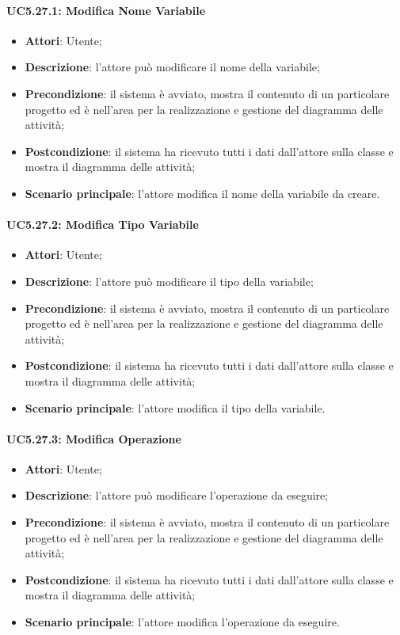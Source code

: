 \paragraph{UC5.27.1: Modifica Nome Variabile}
\label{UC5.27.1}
\begin{itemize}
	\item \textbf{Attori}: Utente;
	\item \textbf{Descrizione}: l'attore può modificare il nome della variabile;
	\item \textbf{Precondizione}: il sistema è avviato, mostra il contenuto di un particolare progetto ed è nell'area per la realizzazione e gestione del diagramma delle attività;
	\item \textbf{Postcondizione}: il sistema ha ricevuto tutti i dati dall'attore sulla classe e mostra il diagramma delle attività;
	\item \textbf{Scenario principale}: l'attore modifica il nome della variabile da creare.
\end{itemize}

\paragraph{UC5.27.2: Modifica Tipo Variabile}
\label{UC5.27.2}
\begin{itemize}
	\item \textbf{Attori}: Utente;
	\item \textbf{Descrizione}: l'attore può modificare il tipo della variabile;
	\item \textbf{Precondizione}: il sistema è avviato, mostra il contenuto di un particolare progetto ed è nell'area per la realizzazione e gestione del diagramma delle attività;
	\item \textbf{Postcondizione}: il sistema ha ricevuto tutti i dati dall'attore sulla classe e mostra il diagramma delle attività;
	\item \textbf{Scenario principale}: l'attore modifica il tipo della variabile.
\end{itemize}

\paragraph{UC5.27.3: Modifica Operazione}
\label{UC5.27.3}
\begin{itemize}
	\item \textbf{Attori}: Utente;
	\item \textbf{Descrizione}: l'attore può modificare l'operazione da eseguire;
	\item \textbf{Precondizione}: il sistema è avviato, mostra il contenuto di un particolare progetto ed è nell'area per la realizzazione e gestione del diagramma delle attività;
	\item \textbf{Postcondizione}: il sistema ha ricevuto tutti i dati dall'attore sulla classe e mostra il diagramma delle attività;
	\item \textbf{Scenario principale}: l'attore modifica l'operazione da eseguire.
\end{itemize}

